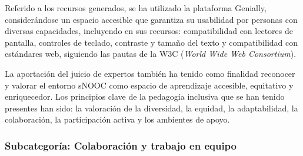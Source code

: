 Referido a los recursos generados, se ha utilizado la plataforma
Genially, considerándose un espacio accesible que garantiza su
usabilidad por personas con diversas capacidades, incluyendo en sus
recursos: compatibilidad con lectores de pantalla, controles de teclado,
contraste y tamaño del texto y compatibilidad con estándares web,
siguiendo las pautas de la W3C (\emph{World Wide Web Consortium}).
	
La aportación del juicio de expertos también ha tenido como finalidad
reconocer y valorar el entorno sNOOC como espacio de aprendizaje
accesible, equitativo y enriquecedor. Los principios clave de la
pedagogía inclusiva que se han tenido presentes han sido: la valoración
de la diversidad, la equidad, la adaptabilidad, la colaboración, la
participación activa y los ambientes de apoyo.
	

\subsubsection{Subcategoría: Colaboración y trabajo en equipo}\label{sub-sub-sec-subcategoríacolaboración}
	
